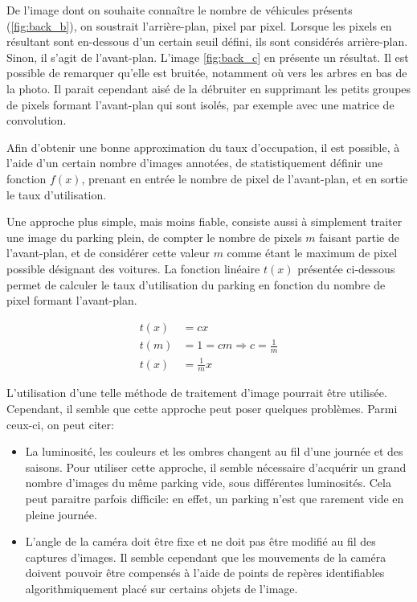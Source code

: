 De l'image dont on souhaite connaître le nombre de véhicules présents (\ref{fig:back_b}), on soustrait l'arrière-plan, pixel par pixel. Lorsque les pixels en résultant sont en-dessous d'un certain seuil défini, ils sont considérés arrière-plan. Sinon, il s'agit de l'avant-plan. L'image \ref{fig:back_c} en présente un résultat. Il est possible de remarquer qu'elle est bruitée, notamment où vers les arbres en bas de la photo. Il parait cependant aisé de la débruiter en supprimant les petits groupes de pixels formant l'avant-plan qui sont isolés, par exemple avec une matrice de convolution.

Afin d'obtenir une bonne approximation du taux d'occupation, il est possible, à l'aide d'un certain nombre d'images annotées, de  statistiquement définir une fonction $f(x)$, prenant en entrée le nombre de pixel de l'avant-plan, et en sortie le taux d'utilisation. 

Une approche plus simple, mais moins fiable, consiste aussi à simplement traiter une image du parking plein, de compter le nombre de pixels $m$ faisant partie de l'avant-plan, et de considérer cette valeur $m$ comme étant le maximum de pixel possible désignant des voitures. La fonction linéaire $t(x)$ présentée ci-dessous permet de calculer le taux d'utilisation du parking en fonction du nombre de pixel formant l'avant-plan.

\begin{align}
    t(x) &= cx \\
    t(m) &= 1 = cm \Longrightarrow c = \frac{1}{m} \\
    t(x) &= \frac{1}{m} x
\end{align}

L'utilisation d'une telle méthode de traitement d'image pourrait être utilisée. Cependant, il semble que cette approche peut poser quelques problèmes. Parmi ceux-ci, on peut citer:

\begin{itemize}
    \item La luminosité, les couleurs et les ombres changent au fil d'une journée et des saisons. Pour utiliser cette approche, il semble nécessaire d'acquérir un grand nombre d'images du même parking vide, sous différentes luminosités. Cela peut paraitre parfois difficile: en effet, un parking n'est que rarement vide en pleine journée.
    \item L'angle de la caméra doit être fixe et ne doit pas être modifié au fil des captures d'images. Il semble cependant que les mouvements de la caméra doivent pouvoir être compensés à l'aide de points de repères identifiables algorithmiquement placé sur certains objets de l'image. 
\end{itemize}

